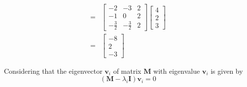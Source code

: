 \documentclass[12pt]{article}
\newcommand{\matr}[1]{\mathbf{#1}}
\newenvironment{question}[2][Question]{\begin{trivlist}
    \item[\hskip \labelsep {\bfseries #1}\hskip \labelsep {\bfseries #2.}]}{\end{trivlist}}
\begin{document}
\begin{align}
    =&\left[\begin{matrix}-2 & -3 & 2\\-1 & 0 & 2\\- \frac{3}{2} & - \frac{3}{2} & 2\end{matrix}\right]	\left[\begin{matrix}4\\2\\3\end{matrix}\right] \\
    =&\left[\begin{matrix}-8\\2\\-3\end{matrix}\right]
\end{align}

\begin{question}{Q. 3}\end{question}
Considering that the eigenvector $\matr v_i$ of matrix $\matr M$ with eigenvalue $\matr v_i$ is given by
\begin{equation}
    \left(\matr M - \lambda_i \matr I \right)\matr v_i = 0 
\end{equation}

\end{document}
